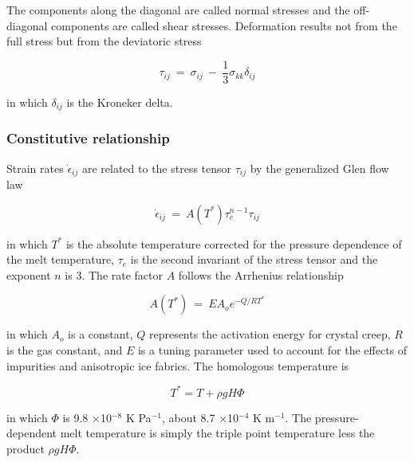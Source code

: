 The components along the diagonal are called normal stresses and the
off-diagonal components are called shear stresses. Deformation results
not from the full stress but from the deviatoric stress

\begin{equation}
\tau_{ ij} ~ = ~ \sigma _{ ij} ~ - ~{\frac{ 1}{ 3}} \sigma _{ kk} \delta _{ ij}
\end{equation}

in which $\delta_{ ij}$ is the Kroneker delta.

\subsubsection{Constitutive relationship}

Strain rates $\dot{\epsilon}_{ij}$ are related to the stress tensor
$\tau_{ij}$ by the generalized Glen flow law

\begin{equation}
\dot{\epsilon}_{ij}~=~A(T^{*})\tau_{e}^{n-1}\tau_{ij}
\end{equation}

in which $T^{*}$ is the absolute temperature corrected for the pressure
dependence of the melt temperature, $\tau_{e}$ is the second invariant
of the stress tensor and the exponent $n$ is 3. The rate factor $A$
follows the Arrhenius relationship

\begin{equation}
A\left( T^{*}\right)~=~E A_{o}e^{-Q/RT^{*}}
\end{equation}

in which $A_{o}$ is a constant, $Q$ represents the activation energy for
crystal creep, $R$ is the gas constant, and $E$ is a tuning parameter
used to account for the effects of impurities and anisotropic ice
fabrics. The homologous temperature is

\begin{equation}
T^{*}=T+\rho g H \Phi
\end{equation}

in which $\Phi$ is 9.8 $\times$10$^{-8}$ K Pa$^{-1}$, about 8.7
$\times$10$^{-4}$ K m$^{-1}$. The pressure-dependent melt temperature is
simply the triple point temperature less the product $\rho g H \Phi$.
